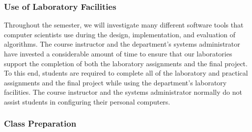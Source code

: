 %
%

\subsubsection*{Use of Laboratory Facilities}

Throughout the semester, we will investigate many different software tools that computer scientists use during the
design, implementation, and evaluation of algorithms.  The course instructor and the department's systems administrator
have invested a considerable amount of time to ensure that our laboratories support the completion of both the
laboratory assignments and the final project.  To this end, students are required to complete all of the laboratory and
practical assignments and the final project while using the department's laboratory facilities. The course instructor
and the systems administrator normally do not assist students in configuring their personal computers.

\subsubsection*{Class Preparation}


